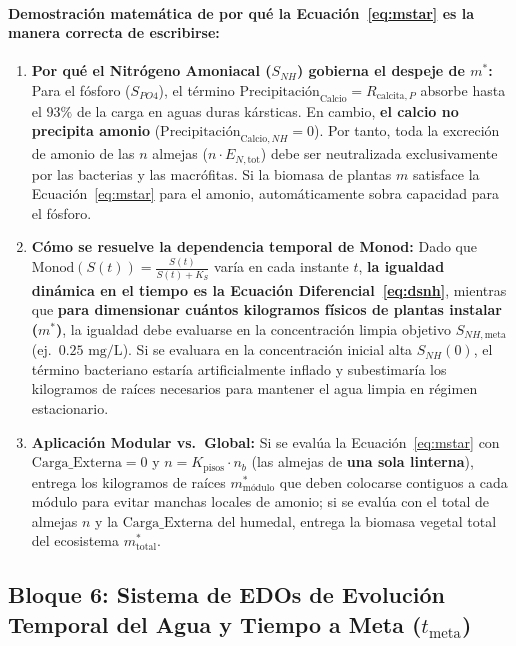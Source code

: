 \documentclass[11pt,letterpaper]{article}
\begin{document}
\paragraph{Demostración matemática de por qué la Ecuación~\eqref{eq:mstar} es la manera correcta de escribirse:}
\begin{enumerate}[leftmargin=1.5em]
    \item \textbf{Por qué el Nitrógeno Amoniacal ($S_{NH}$) gobierna el despeje de $m^*$:} Para el fósforo ($S_{PO4}$), el término $\text{Precipitación}_{\text{Calcio}} = R_{\text{calcita},P}$ absorbe hasta el $93\%$ de la carga en aguas duras kársticas. En cambio, \textbf{el calcio no precipita amonio} ($\text{Precipitación}_{\text{Calcio},NH} = 0$). Por tanto, toda la excreción de amonio de las $n$ almejas ($n \cdot E_{N,\text{tot}}$) debe ser neutralizada exclusivamente por las bacterias y las macrófitas. Si la biomasa de plantas $m$ satisface la Ecuación~\eqref{eq:mstar} para el amonio, automáticamente sobra capacidad para el fósforo.
    \item \textbf{Cómo se resuelve la dependencia temporal de Monod:} Dado que $\text{Monod}(S(t)) = \frac{S(t)}{S(t)+K_S}$ varía en cada instante $t$, \textbf{la igualdad dinámica en el tiempo es la Ecuación Diferencial~\eqref{eq:dsnh}}, mientras que \textbf{para dimensionar cuántos kilogramos físicos de plantas instalar ($m^*$)}, la igualdad debe evaluarse en la concentración limpia objetivo $S_{NH,\text{meta}}$ (ej.\ $0.25\text{ mg/L}$). Si se evaluara en la concentración inicial alta $S_{NH}(0)$, el término bacteriano estaría artificialmente inflado y subestimaría los kilogramos de raíces necesarios para mantener el agua limpia en régimen estacionario.
    \item \textbf{Aplicación Modular vs.\ Global:} Si se evalúa la Ecuación~\eqref{eq:mstar} con $\text{Carga\_Externa} = 0$ y $n = K_{\text{pisos}} \cdot n_b$ (las almejas de \textbf{una sola linterna}), entrega los kilogramos de raíces $m_{\text{módulo}}^*$ que deben colocarse contiguos a cada módulo para evitar manchas locales de amonio; si se evalúa con el total de almejas $n$ y la $\text{Carga\_Externa}$ del humedal, entrega la biomasa vegetal total del ecosistema $m_{\text{total}}^*$.
\end{enumerate}

\subsection{Bloque 6: Sistema de EDOs de Evolución Temporal del Agua y Tiempo a Meta ($t_{\text{meta}}$)}
\end{document}
